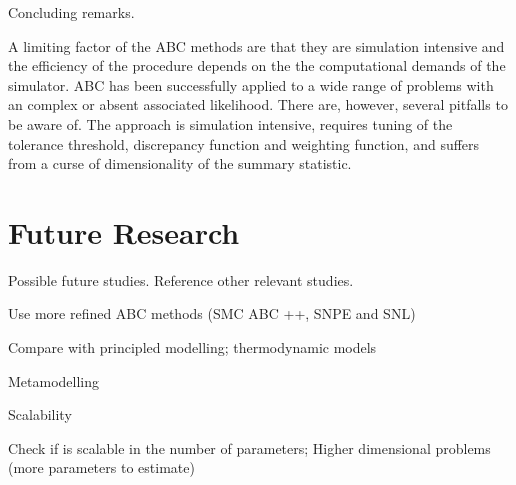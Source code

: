 Concluding remarks.

A limiting factor of the ABC methods are that they are simulation intensive and the efficiency of the procedure depends on the the computational demands of the simulator.  
ABC has been successfully applied to a wide range of problems with an complex or absent associated likelihood. There are, however, several pitfalls to be aware of. The approach is simulation intensive, requires tuning of the tolerance threshold, discrepancy function and weighting function, and suffers from a curse of dimensionality of the summary statistic.  

\section{Future Research}\label{sec:future}

Possible future studies. Reference other relevant studies. 

Use more refined ABC methods
(SMC ABC ++, SNPE and SNL)

Compare with principled modelling; thermodynamic models

Metamodelling

Scalability 

Check if is scalable in the number of parameters;
Higher dimensional problems (more parameters to estimate)

